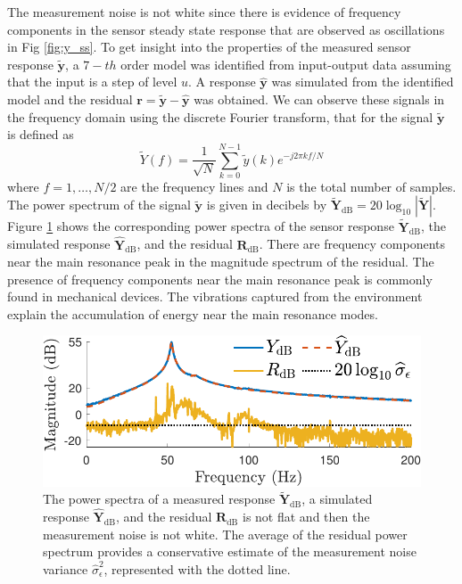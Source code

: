 The measurement noise is not white since there is evidence of frequency components in the sensor steady state response that are observed as oscillations in Fig \ref{fig:y_ss}.
To get insight into the properties of the measured sensor response $\widetilde{\mathbf{y}}$, a $\mathrm{7-}th$ order model was identified from input-output data assuming that the input is a step of level $u$.
A response $\widehat{\mathbf{y}}$ was simulated from the identified model and the residual $\mathbf{r} = \widetilde{\mathbf{y}} - \widehat{\mathbf{y}}$ was obtained. 
We can observe these signals in the frequency domain using the discrete Fourier transform, that for the signal $\widetilde{\mathbf{y}}$ is defined as 
\begin{equation} \widetilde{Y}(f) = \dfrac{1}{\sqrt{N}} \sum_{k=0}^{N-1} \widetilde{y} \left( k \right) e^{-j2\pi k f / N} \label{eqn:FFT} \end{equation}
where $f = 1, \ldots, N/2$ are the frequency lines and $N$ is the total number of samples.
The power spectrum of the signal $\widetilde{\mathbf{y}}$ is given in decibels by $\widetilde{\mathbf{Y}}_\mathrm{dB} = 20 \log_{10}{ |\widetilde{\mathbf{Y}}| } $.
Figure \ref{fig:YYhR_n7} shows the corresponding power spectra of the sensor response $\widetilde{\mathbf{Y}}_\mathrm{dB}$, the simulated response $\widehat{\mathbf{Y}}_\mathrm{dB}$, and the residual $\mathbf{R}_\mathrm{dB}$. 
There are frequency components near the main resonance peak in the magnitude spectrum of the residual.
The presence of frequency components near the main resonance peak is commonly found in mechanical devices.
The vibrations captured from the environment explain the accumulation of energy near the main resonance modes.

\begin{figure}[!htb]
\centering
\includegraphics[width=0.69\columnwidth]{./ChapterExperimentalValidation/fig/Fig_9.pdf}
\caption{ \label{fig:YYhR_n7} 
The power spectra of a measured response $\widetilde{\mathbf{Y}}_\mathrm{dB}$, a simulated response $\widehat{\mathbf{Y}}_\mathrm{dB}$, and the residual $\mathbf{R}_\mathrm{dB}$ is not flat and then the measurement noise is not white. 
The average of the residual power spectrum provides a conservative estimate of the measurement noise variance $\widehat{\sigma}_\epsilon^2$, represented with the dotted line.}
\end{figure}

